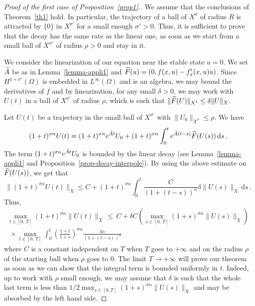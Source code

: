 \documentclass[10pt]{amsart}
\theoremstyle{definition}\newtheorem{defi}[theo]{Definition}\newtheorem{rema}[theo]{Remark}\newtheorem{exam}[theo]{Example}\newtheorem{exem}[theo]{Example}\newtheorem{nota}[theo]{Notation}
\newcommand{\drm}{\mathrm{d}}
\let\oldtilde\tilde
\renewcommand*{\tilde}[1]{\mathchoice{\widetilde{#1}}{\widetilde{#1}}{\oldtilde{#1}}{\oldtilde{#1}}}\let\oldexists\exists
\renewcommand*{\exists}{\mathrel{\oldexists}}
\begin{document}
\begin{proof}[{Proof of the first case of Proposition~\ref{prop1}}.] We assume that the conclusions of Theorem~\ref{th1} hold. In particular, the trajectory of a ball of $X^\sigma$ of radius $R$ is attracted by $\{0\}$ in $X^{\sigma'}$ for a small enough $\sigma'>0$. Thus, it is sufficient to prove that the decay has the same rate as the linear one, as soon as we start from a small ball of $X^{\sigma'}$ of radius $\rho>0$ and stay in it.

We consider the linearization of our equation near the stable state $u=0$. We set $\tilde A$ be as in Lemma~\ref{lemma-appli1} and $\tilde F(u)=(0,f(x,u)-f'_x(x,u)u)$. Since $H^{1+\sigma'}(\Omega)$ is embedded in $L^\infty(\Omega)$ and is an algebra, we may bound the derivatives of $f$ and by linearization, for any small $\delta>0$, we may work with $U(t)$ in a ball of $X^{\sigma'}$ of radius $\rho$, which is such that $\|\tilde F(U)\|_{X^1} \leq \delta \|U\|_{X}$.

Let $U(t)$ be a trajectory in the small ball of $X^{\sigma'}$ with $\|U_0\|_{X^\sigma}\leq \rho$. We have
\[
(1+t)^{\sigma\alpha} U(t)=(1+t)^{\sigma\alpha} e^{\tilde At}U_0 +
(1+t)^{\sigma\alpha} \int_0^t e^{\tilde A(t-s)}\tilde F(U(s))\,\drm s\,.
\]
The term $(1+t)^{\sigma\alpha} e^{\tilde At}U_0$ is bounded by the linear decay (see Lemma~\ref{lemma-appli1} and Proposition~\ref{prop-decay-interpole}). By using the above estimate on $\tilde F(U(s))$, we get that
\[
\|(1+t)^{\sigma\alpha} U(t)\|_X \leq C + (1+t)^{\sigma\alpha} \int_0^t
\frac{C}{(1+(t-s))^\alpha}\delta \|U(s)\|_{X}\,\drm s\,.
\]
Thus,
\begin{multline*}
\max_{t\in[0,\,T]} (1+t)^{\sigma\alpha} \|U(t)\|_X\,\leq\, C + \delta C
\left(\max_{s\in [0,\,T]} (1+s)^{\sigma\alpha} \|U(s)\|_X \right) \\ 
\;\times \max_{t\in[0,\,T]}\int_0^t\left(\frac{1+t}{1+s}\right)^{\sigma\alpha} \frac{\drm s}{(1+(t-s))^\alpha}
\end{multline*}
where $C$ is a constant independent on $T$ when $T$ goes to $+\infty$ and on the radius $\rho$ of the starting ball when $\rho$ goes to $0$. The limit $T\rightarrow +\infty$ will prove our theorem as soon as we can show that the integral term is bounded uniformly in $t$. Indeed, up to work with $\rho$ small enough, we may assume that $\delta$ is such that the whole last term is less than $1/2 \max_{s\in [0,T]} (1+s)^{\sigma\alpha} \|U(s)\|_X$ and may be absorbed by the left hand side.


\end{proof}
\end{document}
